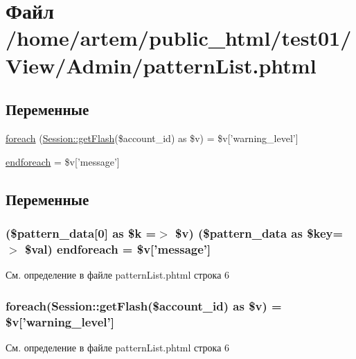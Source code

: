 \hypertarget{pattern_list_8phtml}{\section{Файл /home/artem/public\-\_\-html/test01/\-View/\-Admin/pattern\-List.phtml}
\label{pattern_list_8phtml}
}
\subsection*{Переменные}
\begin{DoxyCompactItemize}
\item 
\hyperlink{pattern_list_8phtml_a1c191ff1be2612f80eabc75951f1841b}{foreach} (\hyperlink{class_session_ae4c4b98671bdd1fbfe4ae9defb5405ad}{Session\-::get\-Flash}(\$account\-\_\-id) as \$v) = \$v\mbox{[}'warning\-\_\-level'\mbox{]}
\item 
\hyperlink{pattern_list_8phtml_a15d4fd6456302daf27bfef966fce02b4}{endforeach} = \$v\mbox{[}'message'\mbox{]}
\end{DoxyCompactItemize}


\subsection{Переменные}
\hypertarget{pattern_list_8phtml_a15d4fd6456302daf27bfef966fce02b4}{
\subsubsection[{endforeach}]{ (\$pattern\-\_\-data\mbox{[}0\mbox{]} as \$k =$>$ \$v) (\$pattern\-\_\-data as \$key=$>$ \$val) endforeach = \$v\mbox{[}'message'\mbox{]}}}\label{pattern_list_8phtml_a15d4fd6456302daf27bfef966fce02b4}


См. определение в файле pattern\-List.\-phtml строка 6

\hypertarget{pattern_list_8phtml_a1c191ff1be2612f80eabc75951f1841b}{
\subsubsection[{foreach}]{\setlength{\rightskip}{0pt plus 5cm}foreach({\bf Session\-::get\-Flash}(\$account\-\_\-id) as \$v) = \$v\mbox{[}'warning\-\_\-level'\mbox{]}}}\label{pattern_list_8phtml_a1c191ff1be2612f80eabc75951f1841b}


См. определение в файле pattern\-List.\-phtml строка 6

